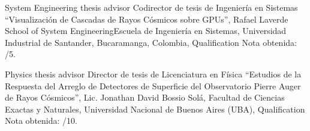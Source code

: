 \ifeng
System Engineering thesis advisor
 \else
Codirector de tesis de Ingeniería en Sistemas
 \fi
``Visualización de Cascadas de Rayos Cósmicos sobre GPUs'', Rafael Laverde \at \ifeng School of System Engineering\else Escuela de Ingeniería en Sistemas\fi, Universidad Industrial de Santander, Bucaramanga, Colombia, \ifeng Qualification \else Nota obtenida: /5.

\ifeng
Physics thesis advisor
 \else
Director de tesis de Licenciatura en Física
 \fi
``Estudios de la Respuesta del Arreglo de Detectores de Superficie del Observatorio Pierre Auger de Rayos Cósmicos'', Lic. Jonathan David Bossio Solá, \at Facultad de Ciencias Exactas y Naturales, Universidad Nacional de Buenos Aires (UBA), \ifeng Qualification \else Nota obtenida: /10.



